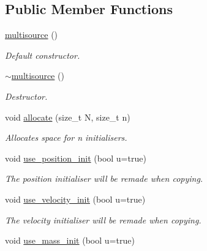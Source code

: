 \subsection*{Public Member Functions}
\begin{DoxyCompactItemize}
\item 
\mbox{\label{classphysim_1_1init_1_1multisource_ad5b585b05f21a66fbeba5253c97e115d}} 
\hyperlink{classphysim_1_1init_1_1multisource_ad5b585b05f21a66fbeba5253c97e115d}{multisource} ()
\begin{DoxyCompactList}\small\item\em Default constructor. \end{DoxyCompactList}\item 
\mbox{\label{classphysim_1_1init_1_1multisource_ab62db1285d151fcd9460e9e9286a621b}} 
\hyperlink{classphysim_1_1init_1_1multisource_ab62db1285d151fcd9460e9e9286a621b}{$\sim$multisource} ()
\begin{DoxyCompactList}\small\item\em Destructor. \end{DoxyCompactList}\item 
void \hyperlink{classphysim_1_1init_1_1multisource_af4a2f1d12712c4d672233539e721f000}{allocate} (size\+\_\+t N, size\+\_\+t n)
\begin{DoxyCompactList}\small\item\em Allocates space for {\itshape n} initialisers. \end{DoxyCompactList}\item 
void \hyperlink{classphysim_1_1init_1_1multisource_a9fb693b4587cac0bd27ad96fc00fc325}{use\+\_\+position\+\_\+init} (bool u=true)
\begin{DoxyCompactList}\small\item\em The position initialiser will be remade when copying. \end{DoxyCompactList}\item 
void \hyperlink{classphysim_1_1init_1_1multisource_ad62414d7308146311f5d7df177c31d8d}{use\+\_\+velocity\+\_\+init} (bool u=true)
\begin{DoxyCompactList}\small\item\em The velocity initialiser will be remade when copying. \end{DoxyCompactList}\item 
void \hyperlink{classphysim_1_1init_1_1multisource_aa61a8925f6363b01e40f37aea40ba730}{use\+\_\+mass\+\_\+init} (bool u=true)

\end{DoxyCompactItemize}
